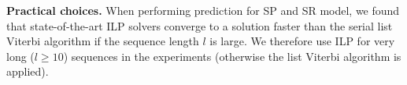 \textbf{Practical choices.}
When performing prediction for SP and SR model, we found that state-of-the-art ILP solvers converge to a solution faster 
than the serial list Viterbi algorithm if the sequence length $l$ is large.
We therefore use ILP for very long ($l\ge10$) sequences in the experiments (otherwise the list Viterbi algorithm is applied).






